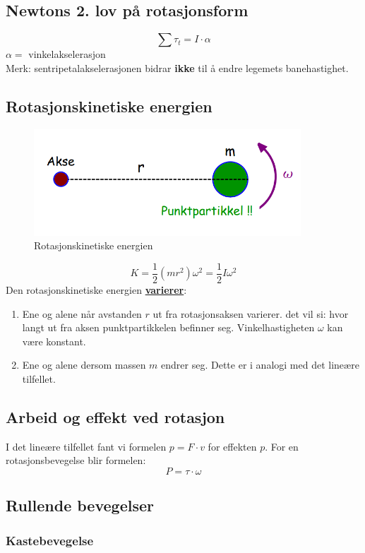 \documentclass[12pt]{article}
\begin{document}
\subsection{Newtons 2. lov på rotasjonsform}
$$\sum \tau_t = I\cdot \alpha$$
$\alpha =$ vinkelakselerasjon\\
Merk: sentripetalakselerasjonen bidrar \textbf{ikke} til å endre legemets banehastighet.


\subsection{Rotasjonskinetiske energien}
\begin{figure} [H]
    \centering
    \includegraphics[height = 4cm]{images/rotation_kinetic.png}
    \caption{Rotasjonskinetiske energien}
\end{figure}
$$K = \frac{1}{2}(mr^2)\omega^2 = \frac{1}{2}I\omega^2$$
Den rotasjonskinetiske energien \underline{\textbf{varierer}}:
\begin{enumerate}
    \item Ene og alene når avstanden $r$ ut fra rotasjonsaksen varierer. det vil si: hvor langt ut fra aksen punktpartikkelen befinner seg. Vinkelhastigheten $\omega$ kan være konstant.
    \item Ene og alene dersom massen $m$ endrer seg. Dette er i analogi med det lineære tilfellet.
\end{enumerate}

\subsection{Arbeid og effekt ved rotasjon}
I det lineære tilfellet fant vi formelen $p = F\cdot v$ for effekten $p$.
For en rotasjonsbevegelse blir formelen:
$$P = \tau \cdot \omega$$

\subsection{Rullende bevegelser}
\subsubsection{Kastebevegelse}
\end{document}

